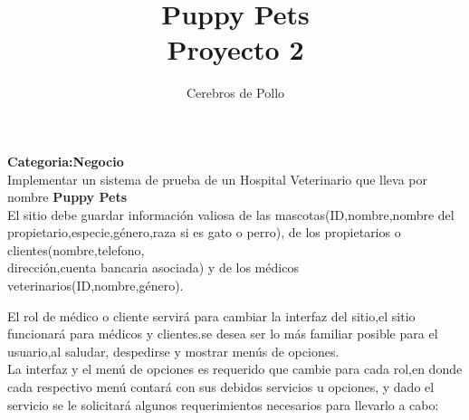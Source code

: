 \documentclass{bachw}
\author{Cerebros de Pollo}
\title{\textbf{Puppy Pets}\\Proyecto 2}
\begin{document}
\textbf{Categoria:Negocio} \\

Implementar un sistema de prueba de un Hospital Veterinario que lleva por nombre \textbf{Puppy Pets}\\

El sitio debe guardar información valiosa de las mascotas(ID,nombre,nombre del propietario,especie,género,raza si es gato o perro),
de los propietarios o clientes(nombre,telefono,\\dirección,cuenta bancaria asociada) y de los médicos veterinarios(ID,nombre,género).

El rol de médico o cliente servirá para cambiar la interfaz del sitio,el sitio funcionará para médicos y clientes.se
desea ser lo más familiar posible para el usuario,al saludar, despedirse y mostrar menús de opciones.\\
La interfaz y el menú de opciones  es requerido que cambie para cada rol,en donde cada respectivo menú contará con sus debidos servicios u opciones, y 
dado el servicio se le solicitará algunos requerimientos necesarios para llevarlo a cabo:
\end{document}
